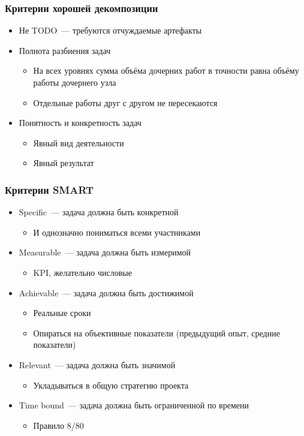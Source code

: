 \documentclass{../../slides-style}
\begin{document}
    \begin{frame}
        \frametitle{Критерии хорошей декомпозиции}
        \begin{itemize}
            \item Не TODO~--- требуются отчуждаемые артефакты
            \item Полнота разбиения задач
            \begin{itemize}
                \item На всех уровнях сумма объёма дочерних работ в точности равна объёму работы дочернего узла
                \item Отдельные работы друг с другом не пересекаются
            \end{itemize}
            \item Понятность и конкретность задач
            \begin{itemize}
                \item Явный вид деятельности
                \item Явный результат
            \end{itemize} 
        \end{itemize}
    \end{frame}

    \begin{frame}
        \frametitle{Критерии SMART}
        \begin{itemize}
            \item Specific~--- задача должна быть конкретной
            \begin{itemize}
                \item И однозначно пониматься всеми участниками
            \end{itemize}
            \item Measurable~--- задача должна быть измеримой
            \begin{itemize}
                \item KPI, желательно числовые
            \end{itemize}
            \item Achievable~--- задача должна быть достижимой 
            \begin{itemize}
                \item Реальные сроки
                \item Опираться на объективные показатели (предыдущий опыт, средние показатели)
            \end{itemize}
            \item Relevant~--- задача должна быть значимой
            \begin{itemize}
                \item Укладываться в общую стратегию проекта
            \end{itemize}
            \item Time bound~--- задача должна быть ограниченной по времени
            \begin{itemize}
                \item Правило 8/80
            \end{itemize}
        \end{itemize}
    \end{frame}
\end{document}
